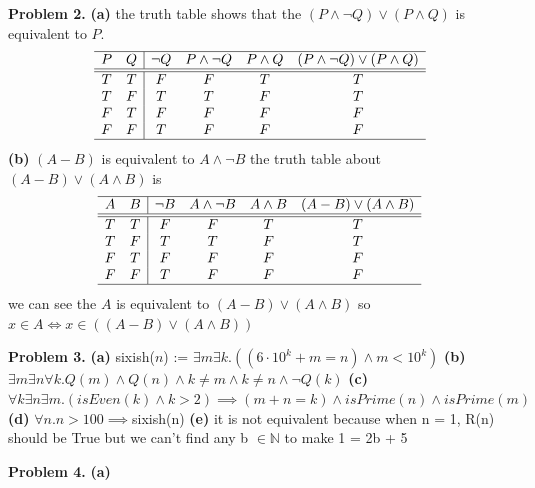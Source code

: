 \documentclass[12pt]{article}
\begin{document}
\noindent \textbf{Problem 2.}
\bigbreak
\noindent \textbf{(a)}
\smallbreak
the truth table shows that the $(P \land \neg Q) \lor (P \land Q)$ is equivalent to $P$.
$$
\begin{array}{cc|cccc}
\hline
P & Q &  \neg Q  &  P \land \neg Q  &  P \land Q  &  (P \land \neg Q) \lor (P \land Q) \\
\hline\hline
T & T &   F   &    F      &    T    &            T         \\
T & F &   T   &    T      &    F    &            T         \\
F & T &   F   &    F      &    F    &            F         \\
F & F &   T   &    F      &    F    &            F         \\
\hline
\end{array}
$$
\smallbreak
\bigbreak
\noindent \textbf{(b)}
\smallbreak
$(A - B)$ is equivalent to $A \land \neg B$
\smallbreak
the truth table about $(A - B) \lor (A \land B)$ is
$$
\begin{array}{cc|cccc}
\hline
A & B & \neg B &  A \land \neg B  &  A \land B  & (A - B) \lor (A \land B)\\
\hline\hline
T & T &  F  &    F      &    T    &         T\\
T & F &  T  &    T      &    F    &         T\\
F & T &  F  &    F      &    F    &         F\\
F & F &  T  &    F      &    F    &         F\\
\hline
\end{array}
$$
\smallbreak
we can see the $A$ is equivalent to $(A - B) \lor (A \land B)$
\smallbreak
so $x \in A \iff x \in ((A - B) \lor (A \land B))$
\bigbreak
\bigbreak

\noindent \textbf{Problem 3.}
\bigbreak
\noindent \textbf{(a)}
sixish($n$) := $\exists m \exists k.((6 \cdot 10^k + m = n) \land m < 10^k )$
\smallbreak
\noindent \textbf{(b)}
$\exists m \exists n \forall k.Q(m) \land Q(n) \land k \neq m \land k \neq n \land \neg Q(k)$
\smallbreak
\noindent \textbf{(c)}
$\forall k \exists n \exists m.(isEven(k) \land k > 2 ) \implies (m + n = k) \land isPrime(n) \land isPrime(m)$
\smallbreak
\noindent \textbf{(d)}
$\forall n.n > 100 \implies $sixish(n)
\smallbreak
\noindent \textbf{(e)}
it is not equivalent because when n = 1, R(n) should be True but we can't find any b $\in \mathbb{N}$ to make 1 = 2b + 5
\bigbreak
\bigbreak

\noindent \textbf{Problem 4.}
\bigbreak
\noindent \textbf{(a)}
\end{document}
